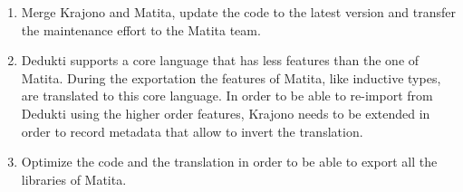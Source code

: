




\begin{enumerate}

  \item Merge Krajono and Matita, update the code to the latest
  version and transfer the maintenance effort to the Matita team.

  \item Dedukti supports a core language that has less features than
  the one of Matita. During the exportation the features of Matita,
  like inductive types, are translated to this core language. In order
  to be able to re-import from Dedukti using the higher order
  features, Krajono needs to be extended in order to record metadata
  that allow to invert the translation.

  \item Optimize the code and the translation in order to be able to
  export all the libraries of Matita.
\end{enumerate}

